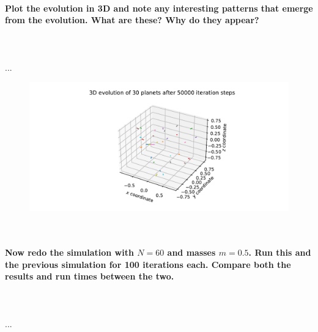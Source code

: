     \paragraph{Plot the evolution in 3D and note any interesting patterns that 
        emerge from the evolution. What are these? Why do they appear?
    } \ \\
        \\
        ...
        \begin{figure}[h!]
            \centering
            \includegraphics[width=\textwidth]{./figures/task2_30body_3D.pdf}
        \end{figure} \ \\ 

    \paragraph{Now redo the simulation with $N=60$ and masses $m=0.5$. Run this and 
        the previous simulation for 100 iterations each. Compare both the 
        results and run times between the two.
    } \ \\
        \\
        ...
